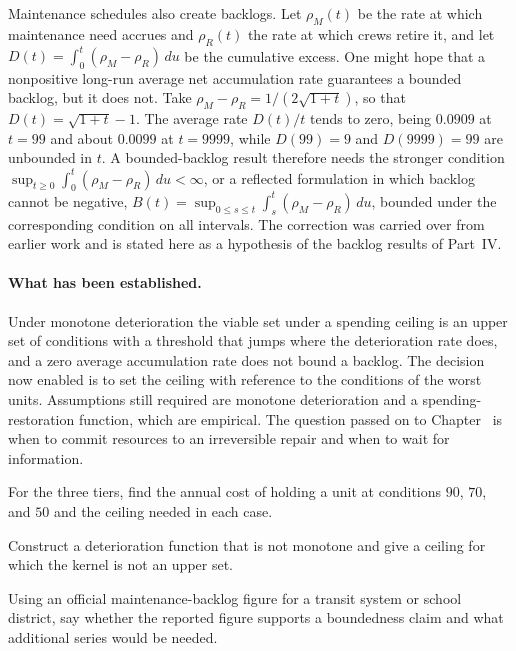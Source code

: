Maintenance schedules also create backlogs. Let $\rho_M(t)$ be the rate at which maintenance need accrues and $\rho_R(t)$ the rate at which crews retire it, and let $D(t)=\int_0^t(\rho_M-\rho_R)\,du$ be the cumulative excess. One might hope that a nonpositive long-run average net accumulation rate guarantees a bounded backlog, but it does not. Take $\rho_M-\rho_R=1/(2\sqrt{1+t})$, so that $D(t)=\sqrt{1+t}-1$. The average rate $D(t)/t$ tends to zero, being $0.0909$ at $t=99$ and about $0.0099$ at $t=9999$, while $D(99)=9$ and $D(9999)=99$ are unbounded in $t$. A bounded-backlog result therefore needs the stronger condition $\sup_{t\ge 0}\int_0^t(\rho_M-\rho_R)\,du<\infty$, or a reflected formulation in which backlog cannot be negative, $B(t)=\sup_{0\le s\le t}\int_s^t(\rho_M-\rho_R)\,du$, bounded under the corresponding condition on all intervals. The correction was carried over from earlier work and is stated here as a hypothesis of the backlog results of Part~IV.

\paragraph{What has been established.} Under monotone deterioration the viable set under a spending ceiling is an upper set of conditions with a threshold that jumps where the deterioration rate does, and a zero average accumulation rate does not bound a backlog. The decision now enabled is to set the ceiling with reference to the conditions of the worst units. Assumptions still required are monotone deterioration and a spending-restoration function, which are empirical. The question passed on to Chapter~ is when to commit resources to an irreversible repair and when to wait for information.

\begin{exercise}
For the three tiers, find the annual cost of holding a unit at conditions $90$, $70$, and $50$ and the ceiling needed in each case.
\end{exercise}
\begin{exercise}
Construct a deterioration function that is not monotone and give a ceiling for which the kernel is not an upper set.
\end{exercise}
\begin{exercise}
Using an official maintenance-backlog figure for a transit system or school district, say whether the reported figure supports a boundedness claim and what additional series would be needed.
\end{exercise}

